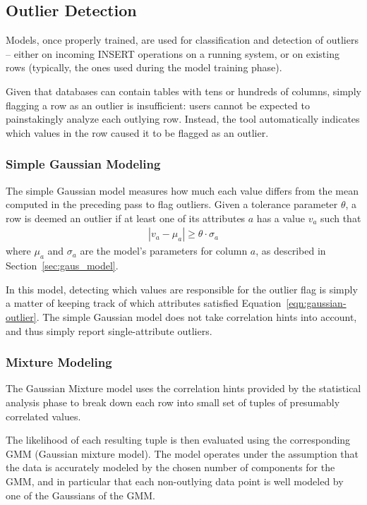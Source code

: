 \subsection{Outlier Detection}
\label{sec:outlier-detection}

Models, once properly trained, are used for classification and detection of outliers -- either on incoming INSERT operations on a running system, or on existing rows (typically, the ones used during the model training phase). %

Given that databases can contain tables with tens or hundreds of columns, simply flagging a row as an outlier is insufficient: users cannot be expected to painstakingly analyze each outlying row. Instead, the tool automatically indicates which values in the row caused it to be flagged as an outlier.

\subsubsection{Simple Gaussian Modeling}
The simple Gaussian model measures how much each value differs from the mean computed in the preceding pass to flag outliers. Given a tolerance parameter $\theta$, a row is deemed an outlier if at least one of its attributes $a$ has a value $v_a$ such that
\begin{align}
  |v_a - \mu_a| \ge \theta \cdot \sigma_a
  \label{eqn:gaussian-outlier}
\end{align}
where $\mu_a$ and $\sigma_a$ are the model's parameters for column $a$, as described in Section~\ref{sec:gaus_model}.

In this model, detecting which values are responsible for the outlier flag is simply a matter of keeping track of which attributes satisfied Equation~\eqref{eqn:gaussian-outlier}. The simple Gaussian model does not take correlation hints into account, and thus simply report single-attribute outliers.

\subsubsection{Mixture Modeling}
The Gaussian Mixture model uses the correlation hints provided by the statistical analysis phase to break down each row into small set of tuples of presumably correlated values.

The likelihood of each resulting tuple is then evaluated using the corresponding GMM (Gaussian mixture model). The model operates under the assumption that the data is accurately modeled by the chosen number of components for the GMM, and in particular that each non-outlying data point is well modeled by one of the Gaussians of the GMM. 

